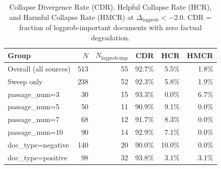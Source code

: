 \begin{table}[h]
\centering
\small
\begin{tabular}{lrrrrr}
\toprule
Group & $N$ & $N_{\text{logprob-imp}}$ & CDR & HCR & HMCR \\
\midrule
  Overall (all sources) & 513 & 55 & 92.7\% & 5.5\% & 1.8\% \\
  Sweep only & 238 & 52 & 92.3\% & 5.8\% & 1.9\% \\
  passage_num=3 & 30 & 15 & 93.3\% & 0.0\% & 6.7\% \\
  passage_num=5 & 50 & 11 & 90.9\% & 9.1\% & 0.0\% \\
  passage_num=7 & 68 & 12 & 91.7\% & 8.3\% & 0.0\% \\
  passage_num=10 & 90 & 14 & 92.9\% & 7.1\% & 0.0\% \\
  doc_type=negative & 140 & 20 & 90.0\% & 10.0\% & 0.0\% \\
  doc_type=positive & 98 & 32 & 93.8\% & 3.1\% & 3.1\% \\
\bottomrule
\end{tabular}
\caption{Collapse Divergence Rate (CDR), Helpful Collapse Rate (HCR), and
Harmful Collapse Rate (HMCR) at $\Delta_{\text{logprob}} < -2.0$.
CDR = fraction of logprob-important documents with zero factual degradation.}
\label{tab:e1_cdr}
\end{table}
